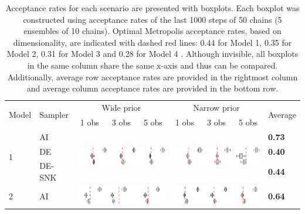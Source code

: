 \begin{table}[ht]
\centering
\caption{Acceptance rates for each scenario are presented with boxplots. Each boxplot was constructed using acceptance rates of the last 1000 steps of 50 chains (5 ensembles of 10 chains). Optimal Metropolis acceptance rates, based on dimensionality, are indicated with dashed red lines: 0.44 for Model 1, 0.35 for Model 2, 0.31 for Model 3 and 0.28 for Model 4 \citep{schmon2022optimal}. Although invisible, all boxplots in the same column share the same x-axis and thus can be compared. Additionally, average row acceptance rates are provided in the rightmost column and average column acceptance rates are provided in the bottom row.}
\label{tab_fracs}
\begin{tabularx}{\textwidth}{llXXXXXXl}
\toprule
\multirow{2}{*}{Model} & \multirow{2}{*}{Sampler} & \multicolumn{3}{c}{Wide prior} & \multicolumn{3}{c}{Narrow prior} & \multirow{2}{*}{Average}\\
\cmidrule(lr){3-5} \cmidrule(lr){6-8}
& & \multicolumn{1}{c}{1 obs} & \multicolumn{1}{c}{3 obs} & \multicolumn{1}{c}{5 obs} & \multicolumn{1}{c}{1 obs} & \multicolumn{1}{c}{3 obs} & \multicolumn{1}{c}{5 obs} & \\
\cmidrule(lr){1-2} \cmidrule(lr){3-5} \cmidrule(lr){6-8} \cmidrule(lr){9-9}
\multirow{3}{*}{1} & AI & \multicolumn{3}{c}{\multirow{3}{*}{\includegraphics[width=6cm]{Figures/boxplots_model1_priorbroad.png}}} & \multicolumn{3}{c}{\multirow{3}{*}{\includegraphics[width=6cm]{Figures/boxplots_model1_priornarrow.png}}} & \textbf{0.73}\\
& DE & \multicolumn{3}{c}{} & \multicolumn{3}{c}{} & \textbf{0.40}\\
& DE-SNK & \multicolumn{3}{c}{} & \multicolumn{3}{c}{} & \textbf{0.44}\\
\cmidrule(lr){1-2} \cmidrule(lr){3-5} \cmidrule(lr){6-8} \cmidrule(lr){9-9}
\multirow{3}{*}{2} & AI & \multicolumn{3}{c}{\multirow{3}{*}{\includegraphics[width=6cm]{Figures/boxplots_model2_priorbroad.png}}} & \multicolumn{3}{c}{\multirow{3}{*}{\includegraphics[width=6cm]{Figures/boxplots_model2_priornarrow.png}}} & \textbf{0.64}\\

\end{tabularx}
\end{table}
